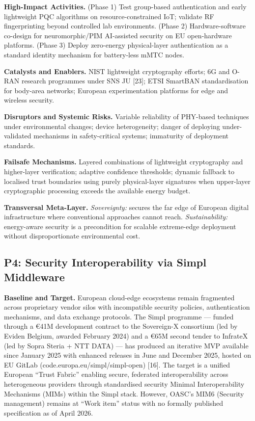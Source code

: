 \documentclass{ieeeaccess}
\begin{document}
\textbf{High-Impact Activities.} (Phase 1) Test group-based
authentication and early lightweight PQC algorithms on
resource-constrained IoT; validate RF fingerprinting beyond controlled
lab environments. (Phase 2) Hardware-software co-design for
neuromorphic/PIM AI-assisted security on EU open-hardware platforms.
(Phase 3) Deploy zero-energy physical-layer authentication as a standard
identity mechanism for battery-less mMTC nodes.

\textbf{Catalysts and Enablers.} NIST lightweight cryptography efforts;
6G and O-RAN research programmes under SNS JU {[}23{]}; ETSI SmartBAN
standardisation for body-area networks; European experimentation
platforms for edge and wireless security.

\textbf{Disruptors and Systemic Risks.} Variable reliability of
PHY-based techniques under environmental changes; device heterogeneity;
danger of deploying under-validated mechanisms in safety-critical
systems; immaturity of deployment standards.

\textbf{Failsafe Mechanisms.} Layered combinations of lightweight
cryptography and higher-layer verification; adaptive confidence
thresholds; dynamic fallback to localised trust boundaries using purely
physical-layer signatures when upper-layer cryptographic processing
exceeds the available energy budget.

\textbf{Transversal Meta-Layer.} \emph{Sovereignty:} secures the far
edge of European digital infrastructure where conventional approaches
cannot reach. \emph{Sustainability:} energy-aware security is a
precondition for scalable extreme-edge deployment without
disproportionate environmental cost.

\subsection{P4: Security Interoperability via Simpl
Middleware}\label{p4-security-interoperability-via-simpl-middleware}

\textbf{Baseline and Target.} European cloud-edge ecosystems remain
fragmented across proprietary vendor silos with incompatible security
policies, authentication mechanisms, and data exchange protocols. The
Simpl programme --- funded through a €41M development contract to the
Sovereign-X consortium (led by Eviden Belgium, awarded February 2024)
and a €65M second tender to InfrateX (led by Sopra Steria + NTT DATA)
--- has produced an iterative MVP available since January 2025 with
enhanced releases in June and December 2025, hosted on EU GitLab
(code.europa.eu/simpl/simpl-open) {[}16{]}. The target is a unified
European ``Trust Fabric'' enabling secure, federated interoperability
across heterogeneous providers through standardised security Minimal
Interoperability Mechanisms (MIMs) within the Simpl stack. However,
OASC's MIM6 (Security management) remains at ``Work item'' status with
no formally published specification as of April 2026.
\end{document}
